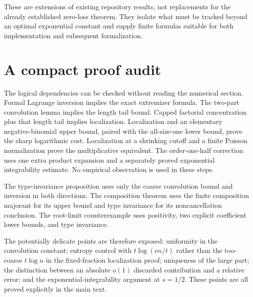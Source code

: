 \documentclass[11pt,a4paper]{article}
\theoremstyle{definition}
\theoremstyle{remark}
\newcommand{\ee}{\mathrm e}
\numberwithin{equation}{section}
\begin{document}
These are extensions of existing repository results, not replacements
for the already established zero-loss theorem. They isolate what must
be tracked beyond an optimal exponential constant and supply finite
formulas suitable for both implementation and subsequent formalization.

\appendix
\section{A compact proof audit}\label{app:audit}
The logical dependencies can be checked without reading the numerical
section. Formal Lagrange inversion implies the exact extremizer formula.
The two-part convolution lemma implies the length tail bound. Capped
factorial concentration plus that length tail implies localization.
Localization and an elementary negative-binomial upper bound, paired
with the all-size-one lower bound, prove the sharp logarithmic cost.
Localization at a shrinking cutoff and a finite Poisson normalization
prove the multiplicative equivalent. The order-one-half correction uses
one extra product expansion and a separately proved exponential
integrability estimate. No empirical observation is used in these steps.

The type-invariance proposition uses only the coarse convolution bound
and inversion in both directions. The composition theorem uses the
finite composition majorant for its upper bound and type invariance
for its noncancellation conclusion. The root-limit counterexample uses
positivity, two explicit coefficient lower bounds, and type invariance.

The potentially delicate points are therefore exposed: uniformity in
the convolution constant; entropy control with $t\log(\ee n/t)$ rather
than the too-coarse $t\log n$ in the fixed-fraction localization proof;
uniqueness of the large part; the distinction between an absolute
$o(1)$ discarded contribution and a relative error; and the
exponential-integrability argument at $s=1/2$. These points are all
proved explicitly in the main text.
\end{document}
